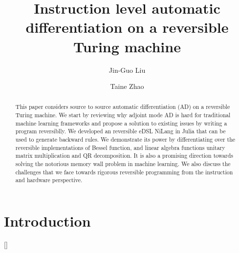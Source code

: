 \documentclass[aps,twocolumn,longbibliography,english,superscriptaddress]{revtex4-1}
\newcommand{\<}{\langle}
\renewcommand{\>}{\rangle}
\newcommand{\blue}[1]{[{\bf  \color{blue}{JG: #1}}]}
\theoremstyle{definition}\newtheorem{definition}{\textit{Definition}}
\begin{document}
\title{Instruction level automatic differentiation on a reversible Turing machine}


\author{Jin-Guo Liu}

\author{Taine Zhao}

\begin{abstract}
    This paper considers source to source automatic differentiation (AD) on a reversible Turing machine. We start by reviewing why adjoint mode AD is hard for traditional machine learning frameworks and propose a solution to existing issues by writing a program reversiblly. We developed an reversible eDSL NiLang in Julia that can be used to generate backward rules. We demonstrate its power by differentiating over the reversible implementations of Bessel function, and linear algebra functions unitary matrix multiplication and QR decomposition. It is also a promising direction towards solving the notorious memory wall problem in machine learning. We also discuss the challenges that we face towards rigorous reversible programming from the instruction and hardware perspective.
\end{abstract}


\maketitle

\section{Introduction}\label{sec:intro}
    \blue{this is a comment!}
\end{document}
